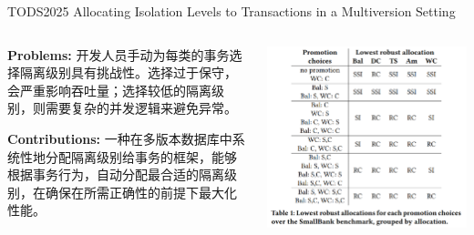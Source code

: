 \begin{frame}{TODS2025 Allocating Isolation Levels to Transactions in a Multiversion Setting}
	\begin{columns}
		\begin{column}{0.5\textwidth}
			\textbf{Problems: }开发人员手动为每类的事务选择隔离级别具有挑战性。选择过于保守，会严重影响吞吐量；选择较低的隔离级别，则需要复杂的并发逻辑来避免异常。

			\textbf{Contributions: }一种在多版本数据库中系统性地分配隔离级别给事务的框架，能够根据事务行为，自动分配最合适的隔离级别，在确保在所需正确性的前提下最大化性能。
		\end{column}
		\begin{column}{0.5\textwidth}
			\includegraphics[width=0.98\linewidth]{figs/lowest-robust-allocations}
		\end{column}
	\end{columns}
\end{frame}

